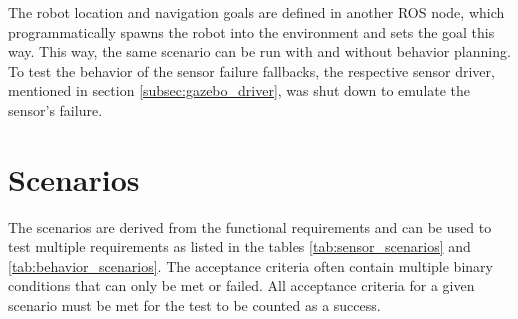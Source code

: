 The robot location and navigation goals are defined in another ROS node, which programmatically spawns the robot into the environment and sets the goal this way. This way, the same scenario can be run with and without behavior planning. To test the behavior of the sensor failure fallbacks, the respective sensor driver, mentioned in section \ref{subsec:gazebo_driver}, was shut down to emulate the sensor's failure. 

\section{Scenarios}

The scenarios are derived from the functional requirements and can be used to test multiple requirements as listed in the tables \ref{tab:sensor_scenarios} and \ref{tab:behavior_scenarios}. The acceptance criteria often contain multiple binary conditions that can only be met or failed. All acceptance criteria for a given scenario must be met for the test to be counted as a success. 

